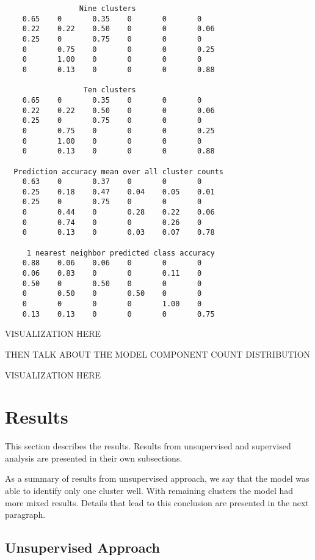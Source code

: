 \documentclass[a4paper]{article}
\begin{document}
\begin{verbatim}
                 Nine clusters
    0.65    0       0.35    0       0       0   
    0.22    0.22    0.50    0       0       0.06
    0.25    0       0.75    0       0       0   
    0       0.75    0       0       0       0.25
    0       1.00    0       0       0       0   
    0       0.13    0       0       0       0.88

                  Ten clusters
    0.65    0       0.35    0       0       0   
    0.22    0.22    0.50    0       0       0.06
    0.25    0       0.75    0       0       0   
    0       0.75    0       0       0       0.25
    0       1.00    0       0       0       0   
    0       0.13    0       0       0       0.88

  Prediction accuracy mean over all cluster counts
    0.63    0       0.37    0       0       0   
    0.25    0.18    0.47    0.04    0.05    0.01
    0.25    0       0.75    0       0       0   
    0       0.44    0       0.28    0.22    0.06
    0       0.74    0       0       0.26    0   
    0       0.13    0       0.03    0.07    0.78

     1 nearest neighbor predicted class accuracy
    0.88    0.06    0.06    0       0       0   
    0.06    0.83    0       0       0.11    0   
    0.50    0       0.50    0       0       0   
    0       0.50    0       0.50    0       0   
    0       0       0       0       1.00    0   
    0.13    0.13    0       0       0       0.75
\end{verbatim}

\par
VISUALIZATION HERE

\par
THEN TALK ABOUT THE MODEL COMPONENT COUNT DISTRIBUTION

\par
VISUALIZATION HERE

\section{Results}

This section describes the results. Results from unsupervised and supervised analysis are presented in their own subsections.

As a summary of results from unsupervised approach, we say that the model was able to identify only one cluster well. With remaining clusters the model had more mixed results. Details that lead to this conclusion are presented in the next paragraph.

\subsection{Unsupervised Approach}
\end{document}
